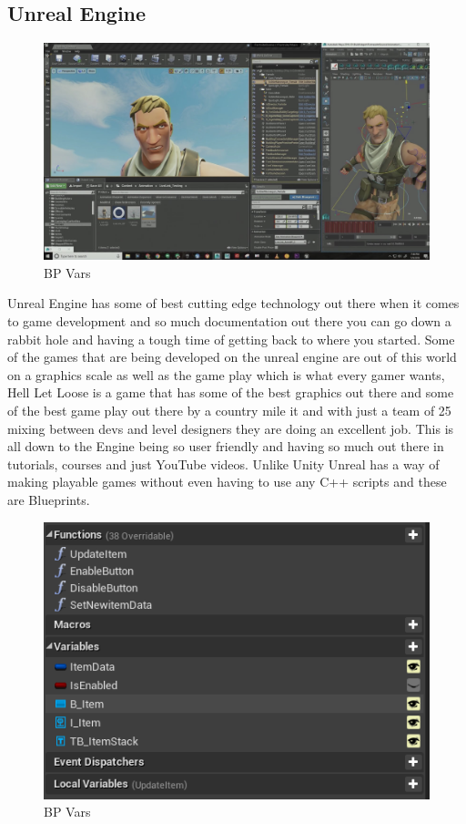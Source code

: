 \subsection{Unreal Engine}
\begin{figure}[H]
    \centering
    \includegraphics[scale=.3]{img/Unreal.jpg}
    \caption{BP Vars}
    \label{Unreal Engine}
\end{figure}
Unreal Engine has some of best cutting edge technology out there when it comes to game development and so much documentation out there you can go down a rabbit hole and having a tough time of getting back to where you started. Some of the games that are being developed on the unreal engine are out of this world on a graphics scale as well as the game play which is what every gamer wants, Hell Let Loose is a game that has some of the best graphics out there and some of the best game play out there by a country mile it and with just a team of 25 mixing between devs and level designers they are doing an excellent job. This is all down to the Engine being so user friendly and having so much out there in tutorials, courses and just YouTube videos. Unlike Unity Unreal has a way of making playable games without even having to use any C++ scripts and these are Blueprints.
\begin{figure}[H]
    \centering
    \includegraphics[scale=.7]{img/BlueprintVars.png}
    \caption{BP Vars}
    \label{Unreal Blueprints}
\end{figure}
